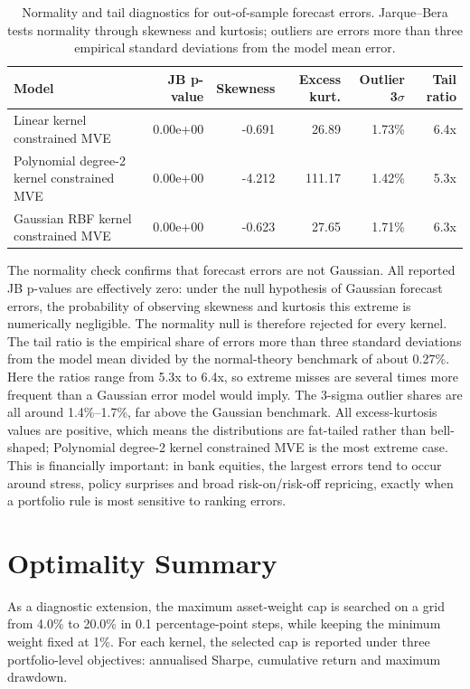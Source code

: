 ﻿\documentclass[10pt,a4paper]{article}
\begin{document}
\begin{table}[H]\centering\small
\begin{tabular}{lrrrrr}
\toprule
Model & JB p-value & Skewness & Excess kurt. & Outlier 3$\sigma$ & Tail ratio \\
\midrule
Linear kernel constrained MVE & 0.00e+00 & -0.691 & 26.89 & 1.73\% & 6.4x \\
Polynomial degree-2 kernel constrained MVE & 0.00e+00 & -4.212 & 111.17 & 1.42\% & 5.3x \\
Gaussian RBF kernel constrained MVE & 0.00e+00 & -0.623 & 27.65 & 1.71\% & 6.3x \\
\bottomrule
\end{tabular}
\caption{Normality and tail diagnostics for out-of-sample forecast errors. Jarque--Bera tests normality through skewness and kurtosis; outliers are errors more than three empirical standard deviations from the model mean error.}
\end{table}

The normality check confirms that forecast errors are not Gaussian. All reported JB p-values are effectively zero: under the null hypothesis of Gaussian forecast errors, the probability of observing skewness and kurtosis this extreme is numerically negligible. The normality null is therefore rejected for every kernel. The tail ratio is the empirical share of errors more than three standard deviations from the model mean divided by the normal-theory benchmark of about 0.27\%. Here the ratios range from 5.3x to 6.4x, so extreme misses are several times more frequent than a Gaussian error model would imply. The 3-sigma outlier shares are all around 1.4\%--1.7\%, far above the Gaussian benchmark. All excess-kurtosis values are positive, which means the distributions are fat-tailed rather than bell-shaped; Polynomial degree-2 kernel constrained MVE is the most extreme case. This is financially important: in bank equities, the largest errors tend to occur around stress, policy surprises and broad risk-on/risk-off repricing, exactly when a portfolio rule is most sensitive to ranking errors.


\section{Optimality Summary}

As a diagnostic extension, the maximum asset-weight cap is searched on a grid from 4.0\% to 20.0\% in 0.1 percentage-point steps, while keeping the minimum weight fixed at 1\%. For each kernel, the selected cap is reported under three portfolio-level objectives: annualised Sharpe, cumulative return and maximum drawdown.
\end{document}
